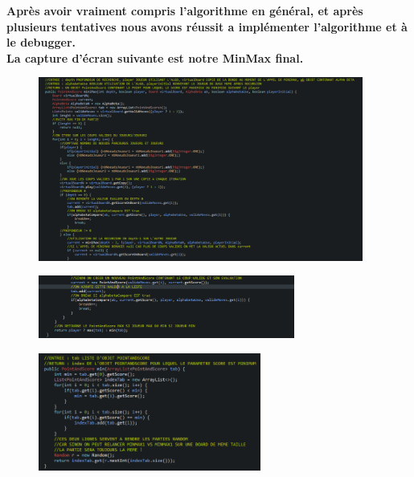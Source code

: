 \centering \textbf{Après avoir vraiment compris l'algorithme en général, et après plusieurs tentatives nous avons
réussit a implémenter l'algorithme et à le debugger.} \\ 


\centering \textbf{La capture d'écran suivante est notre MinMax final.}

\begin{figure}[!ht]
\begin{center}
\includegraphics[width=0.95\textwidth]{./MINMAX1} 
\end{center}
\end{figure}

\begin{figure}[!ht]
\begin{center}
\includegraphics[width=0.75\textwidth]{./MINMAX2}
\end{center}
\end{figure}

\begin{figure}[!ht]
\begin{center}
\includegraphics[width=0.65\textwidth]{./MIN}
\end{center}
\end{figure}

